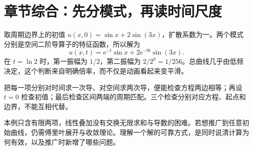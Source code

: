 \section*{章节综合：先分模式，再读时间尺度}
取周期边界上的初值 $u(x,0)=\sin x+2\sin(3x)$，扩散系数为一。两个模式分别是空间二阶导算子的特征函数，所以解为
\[u(x,t)=\mathrm e^{-t}\sin x+2\mathrm e^{-9t}\sin(3x).\]
在 $t=\ln2$ 时，第一振幅为 $1/2$，第二振幅为 $2/2^9=1/256$。总曲线几乎由低频决定，这个判断来自明确倍率，而不仅是动画看起来变平滑。

把每一项分别对时间求一次导、对空间求两次导，便能检查方程两边相等；再设 $t=0$ 检查初值；最后检查区间两端的周期匹配。三个检查分别对应方程、起点和边界，不能互相代替。

本例只含有限两项，线性叠加没有交换无限求和与导数的困难。若想推广到任意初始曲线，仍需傅里叶展开与收敛理论。理解一个解的可靠方式，是同时说清计算为何有效，以及推广时新增了哪些问题。
